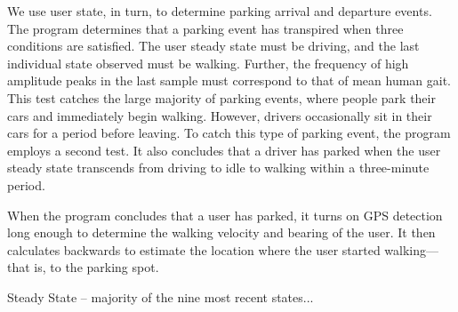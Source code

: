 We use user state, in turn, to determine parking arrival and departure
events. The program determines that a parking event has transpired when
three conditions are satisfied. The user steady state must be driving, and
the last individual state observed must be walking. Further, the frequency
of high amplitude peaks in the last sample must correspond to that of mean
human gait. This test catches the large majority of parking events, where
people park their cars and immediately begin walking. However, drivers
occasionally sit in their cars for a period before leaving. To catch this
type of parking event, the program employs a second test. It also concludes
that a driver has parked when the user steady state transcends from driving
to idle to walking within a three-minute period.

When the program concludes that a user has parked, it turns on GPS detection
long enough to determine the walking velocity and bearing of the user. It
then calculates backwards to estimate the location where the user started
walking---that is, to the parking spot.

Steady State – majority of the nine most recent states...
